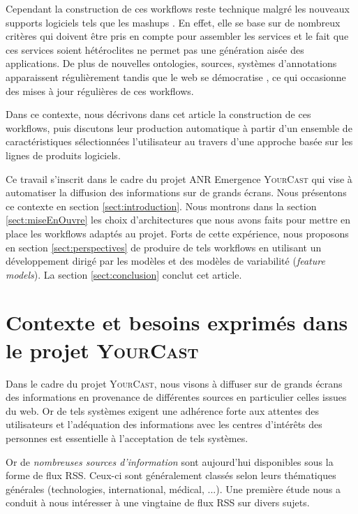 \documentclass[]{ciel}
\newcommand{\Y}[0]{\textsc{YourCast}\xspace}
\begin{document}
Cependant la construction de ces workflows reste technique malgré les nouveaux supports logiciels tels que les mashups \cite{Floyd2007} \cite{Milanovic2004}. En effet, elle se base sur de nombreux critères qui doivent être pris en compte pour assembler les services et le fait que ces services soient hétéroclites ne permet pas une génération aisée des applications. 
De plus de nouvelles ontologies, sources, systèmes d'annotations apparaissent régulièrement tandis que le web se démocratise \cite{Anderruthy2007} \cite{Bross2010}, ce qui occasionne des mises à jour régulières de ces workflows.

Dans ce contexte, nous décrivons dans cet article la construction de ces workflows, puis discutons leur production automatique  à partir d'un ensemble de caractéristiques sélectionnées l'utilisateur au travers d'une approche basée sur les lignes de produits logiciels. 

Ce travail s'inscrit dans le cadre du projet ANR Emergence \Y qui vise à automatiser la diffusion des informations sur de grands écrans. Nous présentons ce contexte en section \ref{sect:introduction}.
Nous montrons dans la section \ref{sect:miseEnOuvre} les choix d'architectures  que nous avons faits pour mettre en place les workflows adaptés au projet. Forts de cette expérience, nous proposons en section \ref{sect:perspectives} de produire de tels workflows en utilisant un développement dirigé par les modèles et des modèles de variabilité (\textit{feature models})\cite{Report1990}.  La section \ref{sect:conclusion} conclut cet article. 



\section{Contexte et besoins exprimés dans le projet \Y}
\label{sect:exemple}
Dans le cadre du projet \Y, nous visons à diffuser sur de grands écrans des informations en provenance de différentes sources en particulier celles issues du web. Or de tels systèmes exigent une adhérence forte aux attentes des utilisateurs et l'adéquation des informations avec les centres d'intérêts des personnes est essentielle à l'acceptation de tels systèmes. 

Or de \textit{nombreuses sources d'information} sont aujourd'hui disponibles sous la forme de flux RSS. Ceux-ci sont généralement classés selon leurs thématiques générales (technologies, international, médical, ...). Une première étude nous a conduit à nous intéresser à une vingtaine de flux RSS sur divers sujets. 
\end{document}
